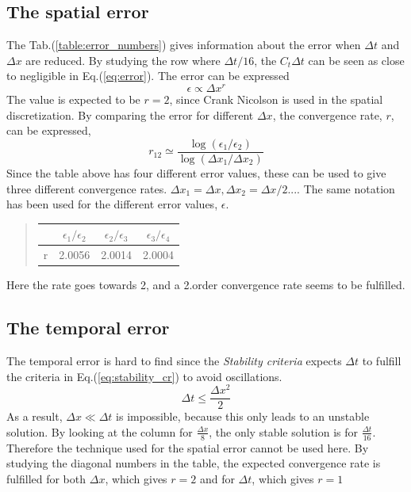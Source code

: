 \documentclass[%
twoside,                 %
final,                   %
10pt]{article}
\begin{document}
\noindent

\subsection{The spatial error}
The Tab.(\ref{table:error_numbers}) gives information about the error when $\Delta t$ and $\Delta x$ are reduced. By studying the row where $\Delta t/16$, the $C_t \Delta t$ can be seen as close to negligible in Eq.(\ref{eq:error}). The error can be expressed 
\begin{equation}
    \epsilon \propto \Delta x^r
\end{equation}
The value is expected to be $r=2$, since Crank Nicolson is used in the spatial discretization. By comparing the error for different $\Delta x$, the convergence rate, $r$, can be expressed, 
\begin{equation} \label{eq:conv_rate}
 r_{12} \simeq \frac{\log(\epsilon_1/\epsilon_2)}{\log(\Delta x_1/\Delta x_2)}
\end{equation}
Since the table above has four different error values, these can be used to give three different convergence rates. $\Delta x_1 = \Delta x, \Delta x_2 = \Delta x/2...$. The same notation has been used for the different error values, $\epsilon$.

\begin{quote}
\begin{tabular}{cccc}
\hline
\multicolumn{1}{c}{  } & \multicolumn{1}{c}{ $\epsilon_1/\epsilon_2$ } & \multicolumn{1}{c}{ $\epsilon_2/\epsilon_3$ } & \multicolumn{1}{c}{ $\epsilon_3/\epsilon_4$ } \\
\hline
r & 2.0056                  & 2.0014                  & 2.0004                  \\
\hline
\end{tabular}
\end{quote}

\noindent
Here the rate goes towards 2, and a 2.order convergence rate seems to be fulfilled.
\subsection{The temporal error}
The temporal error is hard to find since the \emph{Stability criteria} expects $\Delta t$ to fulfill the criteria in Eq.(\ref{eq:stability_cr}) to avoid oscillations.
\begin{equation} \label{eq:stability_cr}
 \Delta t \leq \frac{\Delta x^2}{2}
\end{equation}
As a result, $\Delta x \ll \Delta t$ is impossible, because this only leads to an unstable solution. By looking at the column for $\frac{\Delta x}{8}$, the only stable solution is for $\frac{\Delta t}{16}$. Therefore the technique used for the spatial error cannot be used here. By studying the diagonal numbers in the table, the expected convergence rate is fulfilled for both $\Delta x$, which gives $r = 2$ and for $\Delta t$, which gives $r=1$   
\end{document}
